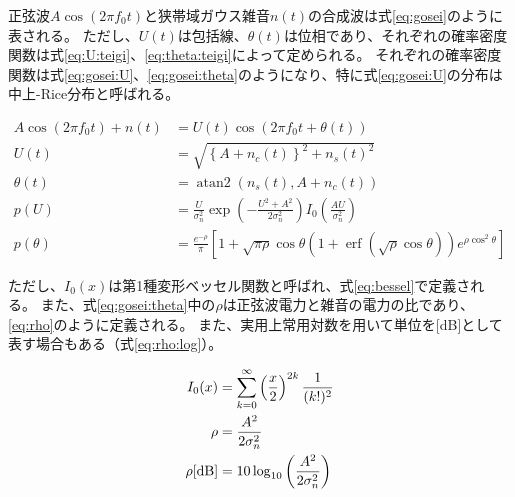 \documentclass[twocolumn, dvipdfmx, 9pt]{jsarticle}
\begin{document}
正弦波$A \operatorname{cos}(2\pi f_0 t)$と狭帯域ガウス雑音$n(t)$の合成波は式\eqref{eq:gosei}のように表される。
ただし、$ U(t)$は包括線、$\theta(t)$は位相であり、それぞれの確率密度関数は式\eqref{eq:U:teigi}、\eqref{eq:theta:teigi}によって定められる。
それぞれの確率密度関数は式\eqref{eq:gosei:U}、\eqref{eq:gosei:theta}のようになり、特に式\eqref{eq:gosei:U}の分布は中上-Rice分布と呼ばれる。

\begin{align}
  \label{eq:gosei} A \cos(2\pi f_0 t) + n(t) &= U(t) \cos(2\pi f_0 t + \theta (t)) \\
  \label{eq:U:teigi} U(t) &= \sqrt{\left\{ A + n_c(t) \right\}^2 + {n_s(t)}^2} \\
  \label{eq:theta:teigi}  \theta (t) &= \operatorname{atan2}(n_s(t), A + n_c(t)) \\
  \label{eq:gosei:U} p(U) &= \frac{U}{\sigma_n^2} \operatorname{exp} \left(-\frac{U^2 + A^2}{2\sigma_n^2} \right) I_0\left(\frac{AU}{\sigma_n^2}\right)  \\
　\label{eq:gosei:theta} p(\theta) &= \frac{e^{-\rho}}{\pi} \left[ 1 + \sqrt{\pi \rho} \cos \theta \left( 1 + \operatorname{erf}\left( \sqrt{\rho} \cos \theta \right) \right) e^{\rho \cos^2 \theta} \right]
\end{align}

ただし、$I_0(x)$は第1種変形ベッセル関数と呼ばれ、式\eqref{eq:bessel}で定義される。
また、式\eqref{eq:gosei:theta}中の$ \rho $は正弦波電力と雑音の電力の比であり、\eqref{eq:rho}のように定義される。
また、実用上常用対数を用いて単位を[dB]として表す場合もある（式\eqref{eq:rho:log}）。

\begin{align}
  \label{eq:bessel} I_0(x) &= \sum_{k=0}^{\infty} \left(\frac{x}{2}\right)^{2k} \frac{1}{(k!)^2} \\
  \label{eq:rho} \rho &= \frac{A^2}{2\sigma_n^2} \\
  \label{eq:rho:log} \rho \rm{[dB]} &= 10 \log_{10} \left( \frac{A^2}{2\sigma_n^2} \right)
\end{align}


\end{document}
